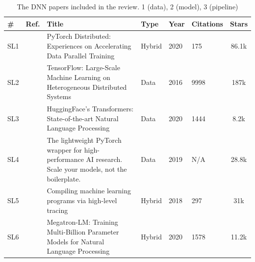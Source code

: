 \begin{table}[h!]
	\centering
	\caption{The DNN papers included in the review. 1 (data), 2 (model), 3 (pipeline)}
	\label{tab:dnn_papers}
	\begin{tabular}{llp{8.4cm}lllc}
		\hline
		\small \textbf{\#} & \small \textbf{Ref.}                    & \small \textbf{Title}                                                                                            & \small \textbf{Type} & \small \textbf{Year} & \small \textbf{Citations} & \small \textbf{Stars}                                                \\[1ex]
		\hline
		\small SL1         & \small \cite{li_pytorch_2020}           & \small PyTorch Distributed: Experiences on Accelerating Data Parallel Training                                   & \small Hybrid        & \small 2020          & \small 175                & \small 86.1k \cite{noauthor_pytorchpytorch_nodate}                   \\[1ex]
		\small SL2         & \small \cite{abadi_tensorflow_2016}     & \small TensorFlow: Large-Scale Machine Learning on Heterogeneous Distributed Systems                             & \small Data          & \small 2016          & \small 9998               & \small 187k \cite{abadi_tensorflow_2015}                             \\[1ex]
		\small SL3         & \small \cite{wolf_huggingfaces_2020}    & \small HuggingFace's Transformers: State-of-the-art Natural Language Processing                                  & \small Data          & \small 2020          & \small 1444               & \small 8.2k \cite{noauthor_huggingfaceaccelerate_2025}               \\[1ex]
		\small SL4         & \small \cite{noauthor_overview_nodate}  & \small The lightweight PyTorch wrapper for high-performance AI research. Scale your models, not the boilerplate. & \small Data          & \small 2019          & \small N/A                & \small 28.8k \cite{falcon_pytorch_2019}                              \\[1ex]
		\small SL5         & \small \cite{frostig_compiling_nodate}  & \small Compiling machine learning programs via high-level tracing                                                & \small Hybrid        & \small 2018          & \small 297                & \small 31k \cite{noauthor_jax-mljax_2025}                            \\[1ex]
		\small SL6         & \small \cite{shoeybi_megatron-lm_2020}  & \small Megatron-LM: Training Multi-Billion Parameter Models for Natural Language Processing                      & \small Hybrid        & \small 2020          & \small 1578               & \small 11.2k \cite{noauthor_nvidiamegatron-lm_2025}                  \\[1ex]

\end{tabular}
\end{table}

